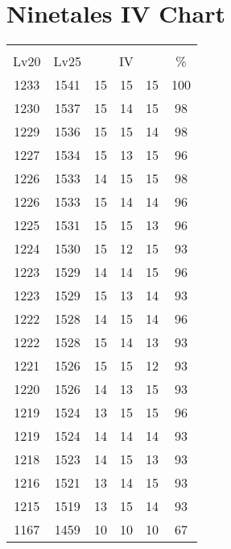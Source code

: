 \documentclass{article}%
\begin{document}
%
\normalsize%
\section{Ninetales IV Chart}%
\label{sec:Ninetales IV Chart}%
\renewcommand{\arraystretch}{1.5}%
\begin{tabular}{|c|c|c|c|c|c|}%
\hline%
\multicolumn{6}{|c|}{\textcolor{white}{ 
\linebreak{Ninetales}
}%
\cellcolor{black}}\\%
\multicolumn{1}{|c}{Lv20}&\multicolumn{1}{c|}{Lv25}&\multicolumn{3}{c|}{IV}&\multicolumn{1}{|c|}{\%}\\%
\hline%
\rowcolor{color100}%
1233&1541&15&15&15&100\\%
\hline%
\rowcolor{color98}%
1230&1537&15&14&15&98\\%
\hline%
\rowcolor{color98}%
1229&1536&15&15&14&98\\%
\hline%
\rowcolor{color96}%
1227&1534&15&13&15&96\\%
\hline%
\rowcolor{color98}%
1226&1533&14&15&15&98\\%
\hline%
\rowcolor{color96}%
1226&1533&15&14&14&96\\%
\hline%
\rowcolor{color96}%
1225&1531&15&15&13&96\\%
\hline%
\rowcolor{color93}%
1224&1530&15&12&15&93\\%
\hline%
\rowcolor{color96}%
1223&1529&14&14&15&96\\%
\hline%
\rowcolor{color93}%
1223&1529&15&13&14&93\\%
\hline%
\rowcolor{color96}%
1222&1528&14&15&14&96\\%
\hline%
\rowcolor{color93}%
1222&1528&15&14&13&93\\%
\hline%
\rowcolor{color93}%
1221&1526&15&15&12&93\\%
\hline%
\rowcolor{color93}%
1220&1526&14&13&15&93\\%
\hline%
\rowcolor{color96}%
1219&1524&13&15&15&96\\%
\hline%
\rowcolor{color93}%
1219&1524&14&14&14&93\\%
\hline%
\rowcolor{color93}%
1218&1523&14&15&13&93\\%
\hline%
\rowcolor{color93}%
1216&1521&13&14&15&93\\%
\hline%
\rowcolor{color93}%
1215&1519&13&15&14&93\\%
\hline%
\rowcolor{color91}%
1167&1459&10&10&10&67\\%
\end{tabular}

%
\end{document}
